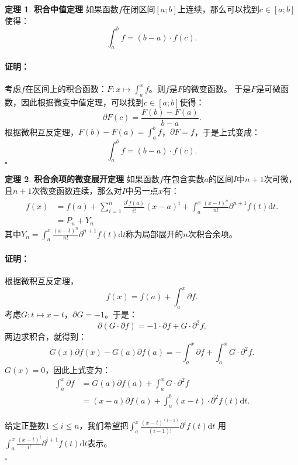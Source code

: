 \documentclass[12pt,UTF8]{ctexbook}
\theoremstyle{definition}
\newtheorem{tm}{定理}[section]
\theoremstyle{plain}
\renewenvironment{proof}{\paragraph{\textbf{证明：}}}{\hfill$\square$}
\begin{document}
\begin{appendix}
\begin{tm}{\textbf{积合中值定理}}
    如果函数$f$在闭区间$[a; b]$上连续，那么可以找到$c\in[a;b]$使得：
    $$ \int_a^b f = (b - a)\cdot f(c).$$
\end{tm}

\begin{proof}
    考虑$f$在区间上的积合函数：$F: x\mapsto \int_a^x f$。则$f$是$F$的微变函数。
    于是$F$是可微函数，因此根据微变中值定理，可以找到$c\in[a;b]$使得：
    $$ \partial F(c) = \frac{F(b) - F(a)}{b - a}.$$
    根据微积互反定理，$F(b) - F(a) = \int_a^b f$，$\partial F = f$，于是上式变成：
    $$ \int_a^b f = (b - a)\cdot f(c).$$
\end{proof}


\begin{tm}{\textbf{积合余项的微变展开定理}}
    如果函数$f$在包含实数$a$的区间$I$中$n+1$次可微，且$n+1$次微变函数连续，那么对$I$中另一点$x$有：
    \begin{align*}
        f(x) &= f(a) + \sum_{i=1}^n \frac{\partial^i f(a)}{i!} (x - a)^i + \int_a^x \frac{(x - t)^{n}}{n!} \partial^{n+1} f(t)\mathrm{d}t. \\
        &= P_n + Y_n 
    \end{align*}
    其中$Y_n = \int_a^x \frac{(x - t)^{n}}{n!} \partial^{n+1} f(t)\mathrm{d}t$称为局部展开的$n$次积合余项。
\end{tm}

\begin{proof}
    根据微积互反定理，
    $$ f(x) = f(a) + \int_a^x \partial f .$$
    考虑$G : t \mapsto x - t $，$\partial G = -1$。于是：
    $$ \partial (G\cdot \partial f) = -1 \cdot \partial f + G \cdot \partial^2 f. $$
    两边求积合，就得到：
    $$ G(x) \partial f(x) - G(a) \partial f(a) = - \int_a^x \partial f + \int_a^x G \cdot \partial^2 f. $$
    $G(x) = 0$，因此上式变为：
    \begin{align*}
        \int_a^x \partial f &=  G(a) \partial f(a) + \int_a^x G \cdot \partial^2 f \\
        &= (x - a) \partial f(a) + \int_a^b (x - t) \cdot \partial^2 f(t)\mathrm{d}t. 
    \end{align*}
    
    给定正整数$1\leqslant i \leqslant n$，我们希望把$\int_a^x \frac{(x - t)^{(i-1)}}{(i-1)!} \partial^{i} f(t)\mathrm{d}t$
    用$\int_a^x \frac{(x - t)^{i}}{i!} \partial^{i+1} f(t)\mathrm{d}t$表示。


\end{proof}
\end{appendix}
\end{document}
